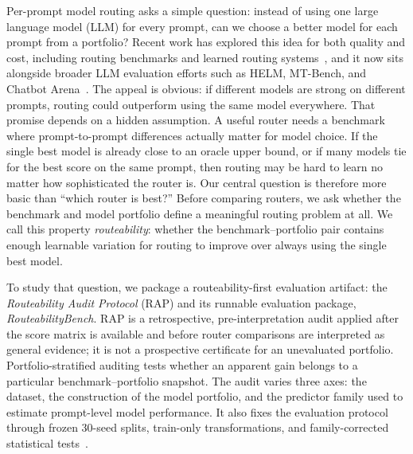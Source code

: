 \documentclass{article}
\begin{document}
Per-prompt model routing asks a simple question: instead of using one large language model (LLM) for every prompt, can we choose a better model for each prompt from a portfolio? Recent work has explored this idea for both quality and cost, including routing benchmarks and learned routing systems~\citep{chen2024frugalgpt, ding2024hybridllm, ong2025routellm, shnitzer2024routing, hu2024routerbench}, and it now sits alongside broader LLM evaluation efforts such as HELM, MT-Bench, and Chatbot Arena~\citep{liang2023helm, zheng2023judging, chiang2024chatbotarena}. The appeal is obvious: if different models are strong on different prompts, routing could outperform using the same model everywhere. That promise depends on a hidden assumption. A useful router needs a benchmark where prompt-to-prompt differences actually matter for model choice. If the single best model is already close to an oracle upper bound, or if many models tie for the best score on the same prompt, then routing may be hard to learn no matter how sophisticated the router is. Our central question is therefore more basic than ``which router is best?'' Before comparing routers, we ask whether the benchmark and model portfolio define a meaningful routing problem at all. We call this property \emph{routeability}: whether the benchmark--portfolio pair contains enough learnable variation for routing to improve over always using the single best model.

To study that question, we package a routeability-first evaluation artifact: the \emph{Routeability Audit Protocol} (RAP) and its runnable evaluation package, \emph{RouteabilityBench}. RAP is a retrospective, pre-interpretation audit applied after the score matrix is available and before router comparisons are interpreted as general evidence; it is not a prospective certificate for an unevaluated portfolio. Portfolio-stratified auditing tests whether an apparent gain belongs to a particular benchmark--portfolio snapshot. The audit varies three axes: the dataset, the construction of the model portfolio, and the predictor family used to estimate prompt-level model performance. It also fixes the evaluation protocol through frozen 30-seed splits, train-only transformations, and family-corrected statistical tests~\citep{wilcoxon1945individual, holm1979simple}.
\end{document}
